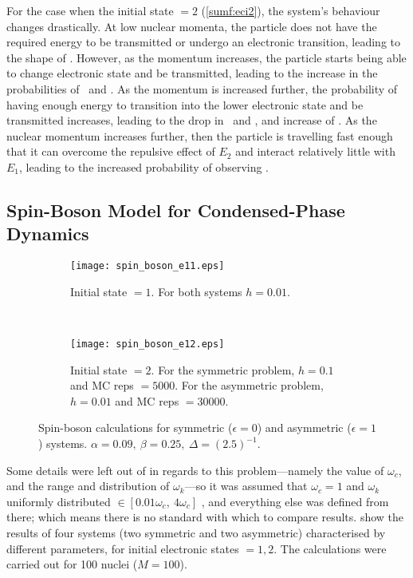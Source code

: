 For the case when the initial state $ = 2 $ (\cref{sumf:eci2}), the system's behaviour changes drastically. At low nuclear momenta, the particle does not have the required energy to be transmitted or undergo an electronic transition, leading to the shape of \rtt. However, as the momentum increases, the particle starts being able to change electronic state and be transmitted, leading to the increase in the probabilities of \rot~and \tot. As the momentum is increased further, the probability of having enough energy to transition into the lower electronic state and be transmitted increases, leading to the drop in \rtt~and \rot, and increase of \tot. As the nuclear momentum increases further, then the particle is travelling fast enough that it can overcome the repulsive effect of $ E_{2} $ and interact relatively little with $ E_{1} $, leading to the increased probability of observing \ttt.
%
\subsection*{Spin-Boson Model for Condensed-Phase Dynamics}
%
\begin{figure}
\begin{subfigure}[t]{0.5\textwidth}
\centering
\texttt{[image: spin\_boson\_e11.eps]}
\caption[]{Initial state $ = 1$. For both systems $ h = 0.01$.}
\label{sumf:sbe11}
\end{subfigure}
~
\begin{subfigure}[t]{0.5\textwidth}
\centering
\texttt{[image: spin\_boson\_e12.eps]}
\caption[]{Initial state $ = 2 $. For the symmetric problem, $ h = 0.1 $ and MC reps $ = 5000 $. For the asymmetric problem, $ h = 0.01 $ and MC reps $ = 30000 $.}
\label{sumf:sbe12}
\end{subfigure}
\caption[]{Spin-boson calculations for symmetric ($ \epsilon = 0 $) and asymmetric ($ \epsilon = 1 $) systems. $\alpha = 0.09,~\beta = 0.25,~\Delta = (2.5)^{-1}$.}\label{sumf:sb1}
\end{figure}

Some details were left out of \cite{project} in regards to this problem---namely the value of $ \omega_{c} $, and the range and distribution of $ \omega_{k} $---so it was assumed that $ \omega_{c} = 1$ and $ \omega_{k} $ uniformly distributed $\in [0.01\omega_{c},~4\omega_{c}] $ \cite{spin-boson}, and everything else was defined from there; which means there is no standard with which to compare results.  show the results of four systems (two symmetric and two asymmetric) characterised by different parameters, for initial electronic states $ = 1, 2 $. The calculations were carried out for 100 nuclei ($ M=100 $).

